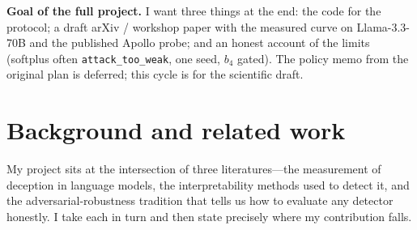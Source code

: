 \documentclass{webofc}
\begin{document}
\textbf{Goal of the full project.} I want three things at the end: the code for
the protocol; a draft arXiv / workshop paper with the measured curve on
Llama-3.3-70B and the published Apollo probe; and an honest account of the
limits (softplus often \texttt{attack\_too\_weak}, one seed, $b_4$ gated). The
policy memo from the original plan is deferred; this cycle is for the scientific
draft.


\section{Background and related work}
\label{sec-related}

My project sits at the intersection of three literatures---the measurement of
deception in language models, the interpretability methods used to detect it,
and the adversarial-robustness tradition that tells us how to evaluate any
detector honestly. I take each in turn and then state precisely where my
contribution falls.
\end{document}
